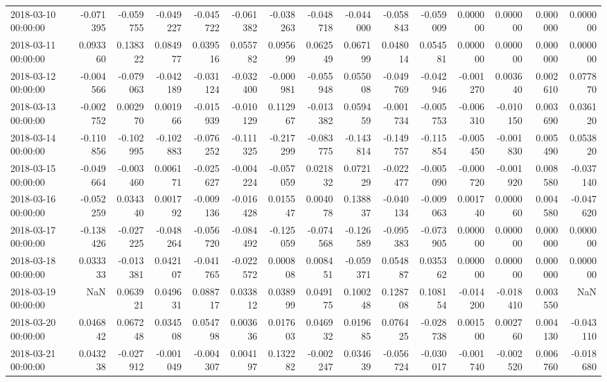 \begin{tabular}{lrrrrrrrrrrrrrr}
2018-03-10 00:00:00 & -0.071395 & -0.059755 & -0.049227 & -0.045722 & -0.061382 & -0.038263 & -0.048718 & -0.044000 & -0.058843 & -0.059009 & 0.000000 & 0.000000 & 0.000000 & 0.000000 \\
2018-03-11 00:00:00 & 0.093360 & 0.138322 & 0.084977 & 0.039516 & 0.055782 & 0.095699 & 0.062549 & 0.067199 & 0.048014 & 0.054581 & 0.000000 & 0.000000 & 0.000000 & 0.000000 \\
2018-03-12 00:00:00 & -0.004566 & -0.079063 & -0.042189 & -0.031124 & -0.032400 & -0.000981 & -0.055948 & 0.055008 & -0.049769 & -0.042946 & -0.001270 & 0.003640 & 0.002610 & 0.077870 \\
2018-03-13 00:00:00 & -0.002752 & 0.002970 & 0.001966 & -0.015939 & -0.010129 & 0.112967 & -0.013382 & 0.059459 & -0.001734 & -0.005753 & -0.006310 & -0.010150 & 0.003690 & 0.036120 \\
2018-03-14 00:00:00 & -0.110856 & -0.102995 & -0.102883 & -0.076252 & -0.111325 & -0.217299 & -0.083775 & -0.143814 & -0.149757 & -0.115854 & -0.005450 & -0.001830 & 0.005490 & 0.053820 \\
2018-03-15 00:00:00 & -0.049664 & -0.003460 & 0.006171 & -0.025627 & -0.004224 & -0.057059 & 0.021832 & 0.072129 & -0.022477 & -0.005090 & -0.000720 & -0.001920 & 0.008580 & -0.037140 \\
2018-03-16 00:00:00 & -0.052259 & 0.034340 & 0.001792 & -0.009136 & -0.016428 & 0.015547 & 0.004078 & 0.138837 & -0.040134 & -0.009063 & 0.001740 & 0.000060 & 0.004580 & -0.047620 \\
2018-03-17 00:00:00 & -0.138426 & -0.027225 & -0.048264 & -0.056720 & -0.084492 & -0.125059 & -0.074568 & -0.126589 & -0.095383 & -0.073905 & 0.000000 & 0.000000 & 0.000000 & 0.000000 \\
2018-03-18 00:00:00 & 0.033333 & -0.013381 & 0.042107 & -0.041765 & -0.022572 & 0.000808 & 0.008451 & -0.059371 & 0.054887 & 0.035362 & 0.000000 & 0.000000 & 0.000000 & 0.000000 \\
2018-03-19 00:00:00 & NaN & 0.063921 & 0.049631 & 0.088717 & 0.033812 & 0.038999 & 0.049175 & 0.100248 & 0.128708 & 0.108154 & -0.014200 & -0.018410 & 0.003550 & NaN \\
2018-03-20 00:00:00 & 0.046842 & 0.067248 & 0.034508 & 0.054798 & 0.003636 & 0.017603 & 0.046932 & 0.019685 & 0.076425 & -0.028738 & 0.001500 & 0.002760 & 0.004130 & -0.043110 \\
2018-03-21 00:00:00 & 0.043238 & -0.027912 & -0.001049 & -0.004307 & 0.004197 & 0.132282 & -0.002247 & 0.034639 & -0.056724 & -0.030017 & -0.001740 & -0.002520 & 0.006760 & -0.018680 \\

\end{tabular}
